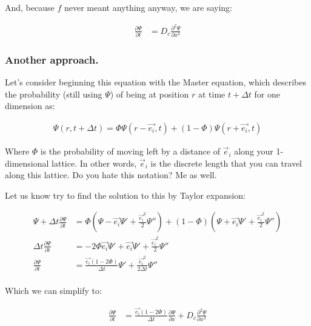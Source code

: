 \documentclass[12pt]{report}
\newcommand{\pr}[1]{\left(#1\right)}
\begin{document}
And, because $f$ never meant anything anyway, we are saying: 

\begin{equation}
\begin{split} \label{sec:diffequation}
    \frac{\partial \Psi}{\partial t} & = D_c \frac{\partial^2 \Psi}{\partial x^2} 
\end{split}
\end{equation}


\subsubsection{Another approach.}

Let's consider beginning this equation with the Master equation, which describes the probability (still using $\Psi$) of being at position $r$ at time $t + \Delta t$ for one dimension as: 

\begin{equation}
\begin{split}
    \Psi(r,t + \Delta t) = \Phi\Psi(r - \Vec{e_i},t) + (1 - \Phi)\Psi(r + \Vec{e_i},t)
\end{split}
\end{equation}

Where $\Phi$ is the probability of moving left by a distance of $\Vec{e}_i$ along your 1-dimensional lattice. In other words, $\Vec{e}_i$ is the discrete length that you can travel along this lattice. Do you hate this notation? Me as well.\newline

Let us know try to find the solution to this by Taylor expansion: 

\begin{equation}
\begin{split}
    \Psi + \Delta t\frac{\partial \Psi}{\partial t} &= \Phi\pr{\Psi - \Vec{e_i}\Psi' + \frac{\Vec{e_i}^2}{2}\Psi''} + (1 - \Phi)\pr{\Psi + \Vec{e_i}\Psi' + \frac{\Vec{e_i}^2}{2}\Psi''} \\
    \Delta t\frac{\partial \Psi}{\partial t} &= -2\Phi\Vec{e_i}\Psi' + \Vec{e_i}\Psi' + \frac{\Vec{e_i}^2}{2}\Psi'' \\
    \frac{\partial \Psi}{\partial t} &= \frac{\Vec{e_i}(1-2\Phi)}{\Delta t}\Psi' + \frac{\Vec{e_i}^2}{2\Delta t}\Psi'' \\
\end{split}
\end{equation}

Which we can simplify to: 

\begin{equation}
\begin{split}
    \frac{\partial \Psi}{\partial t} &= \frac{\Vec{e_i}(1-2\Phi)}{\Delta t}\frac{\partial \Psi}{\partial x} + D_c\frac{\partial^2 \Psi}{\partial x^2} \\
\end{split}
\end{equation}
\end{document}
